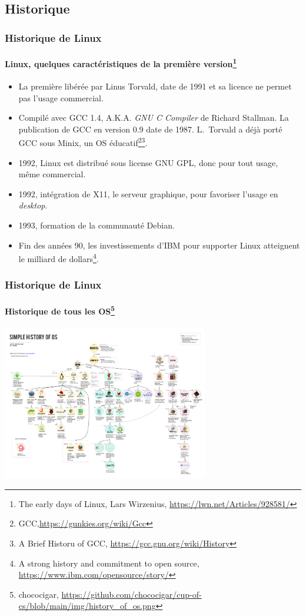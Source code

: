 \documentclass{beamer}
\begin{document}
    \subsection{Historique}\label{subsec:historique}

    \begin{frame}
        \transdissolve
        \frametitle{Historique de Linux}
        \framesubtitle{Linux, quelques caractéristiques de la première version\footnote{The early days of Linux, Lars Wirzenius, \url{https://lwn.net/Articles/928581/}}}
        \begin{footnotesize}
            \begin{itemize}
                \item La première libérée par Linus Torvald, date de 1991 et sa licence ne permet pas l'usage commercial.
                \item Compilé avec GCC 1.4, A.K.A. \textit{GNU C Compiler} de Richard Stallman.
                La publication de GCC en version 0.9 date de 1987.
                L.~Torvald a déjà porté GCC sous Minix, un OS éducatif\footnote{GCC,\url{https://gunkies.org/wiki/Gcc}}\footnotestep\footnote{A Brief Historu of GCC, \url{https://gcc.gnu.org/wiki/History}}.
                \item 1992, Linux est distribué sous license GNU GPL, donc pour tout usage, même commercial.
                \item 1992, intégration de X11, le serveur graphique, pour favoriser l'usage en \textit{desktop}.
                \item 1993, formation de la communauté Debian.
                \item Fin des années 90, les investissements d'IBM pour supporter Linux atteignent le milliard de dollars\footnote{A strong history and commitment to open source, \url{https://www.ibm.com/opensource/story/}}.
            \end{itemize}
        \end{footnotesize}
    \end{frame}

    \begin{frame}
        \transdissolve
        \frametitle{Historique de Linux}
        \framesubtitle{Historique de tous les OS\footnote{chococigar, \url{https://github.com/chococigar/cup-of-cs/blob/main/img/history\_of\_os.png}}}
        \centering
        \includegraphics[width=9cm]{image/history_of_os}
    \end{frame}
\end{document}
